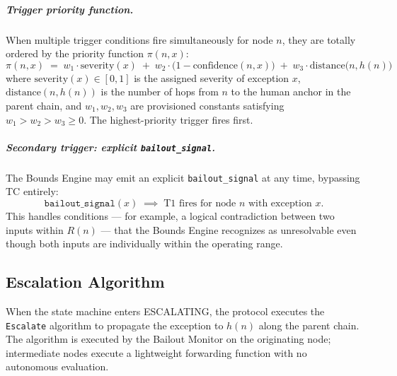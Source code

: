 \subparagraph{Trigger priority function.} When multiple trigger conditions fire simultaneously for node $n$, they are totally ordered by the priority function $\pi(n, x)$:
\begin{equation}
\pi(n, x) \;=\; w_1 \cdot \text{severity}(x) \;+\; w_2 \cdot \bigl(1 - \text{confidence}(n, x)\bigr) \;+\; w_3 \cdot \text{distance}\bigl(n, h(n)\bigr) \tag{PF}
\end{equation}
where $\text{severity}(x) \in [0, 1]$ is the assigned severity of exception $x$, $\text{distance}(n, h(n))$ is the number of hops from $n$ to the human anchor in the parent chain, and $w_1, w_2, w_3$ are provisioned constants satisfying $w_1 > w_2 > w_3 \geq 0$. The highest-priority trigger fires first.

\subparagraph{Secondary trigger: explicit \texttt{bailout\_signal}.} The Bounds Engine may emit an explicit \texttt{bailout\_signal} at any time, bypassing TC entirely:
\begin{equation}
\texttt{bailout\_signal}(x) \;\implies\; \text{T1 fires for node } n \text{ with exception } x. \tag{TC-secondary}
\end{equation}
This handles conditions — for example, a logical contradiction between two inputs within $R(n)$ — that the Bounds Engine recognizes as unresolvable even though both inputs are individually within the operating range.

\subsection{Escalation Algorithm}\label{sec:escalation-algorithm}

When the state machine enters ESCALATING, the protocol executes the \texttt{Escalate} algorithm to propagate the exception to $h(n)$ along the parent chain. The algorithm is executed by the Bailout Monitor on the originating node; intermediate nodes execute a lightweight forwarding function with no autonomous evaluation.

